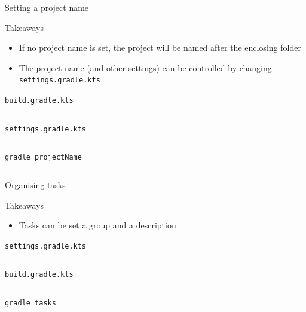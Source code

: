 \documentclass[presentation]{beamer}
\newcommand{\codefile}[4]{
	\begin{block}{\texttt{#2}}
		\inputminted[fontsize=#3,linenos=true,breaklines=true]{#4}{"workspace/#1/#2"}
	\end{block}
}
\newcommand{\kotlin}[3]{\codefile{#1}{#2}{#3}{kotlin}}
\newcommand{\terminal}[3]{\codefile{#1}{#2}{#3}{text}}
\newcommand{\tinier}{\fontsize{4pt}{5pt}\selectfont}
\begin{document}
\begin{frame}{Setting a project name}
    \begin{block}{Takeaways}
        \begin{itemize}
            \item If no project name is set, the project will be named after the enclosing folder            \item The project name (and other settings) can be controlled by changing \texttt{settings.gradle.kts}
        \end{itemize}
    \end{block}
    \kotlin{10-ProjectName}{build.gradle.kts}{\scriptsize}
    \kotlin{10-ProjectName}{settings.gradle.kts}{\scriptsize}
    \terminal{10-ProjectName}{gradle projectName}{\scriptsize}
\end{frame}

\begin{frame}{Organising tasks}
    \begin{block}{Takeaways}
        \begin{itemize}
            \item Tasks can be set a group and a description
        \end{itemize}
    \end{block}
    \terminal{11-TaskDescription}{settings.gradle.kts}{\scriptsize}
    \kotlin{11-TaskDescription}{build.gradle.kts}{\scriptsize}
    \terminal{11-TaskDescription}{gradle tasks}{\tinier}
\end{frame}
\end{document}
